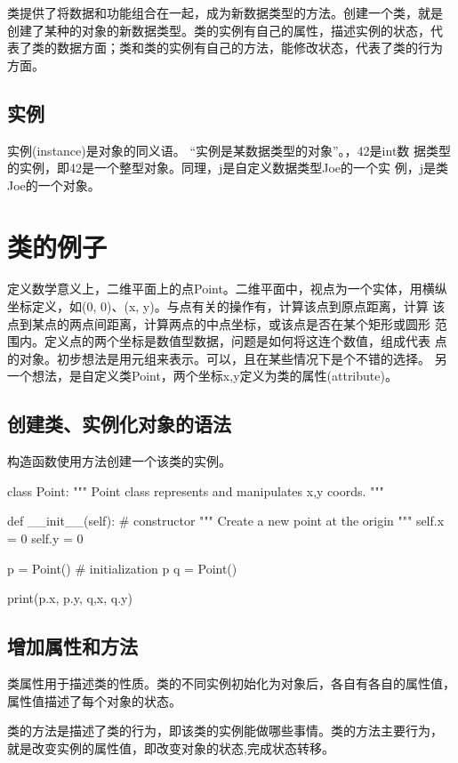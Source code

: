 类提供了将数据和功能组合在一起，成为新数据类型的方法。创建一个类，就是
创建了某种的对象的新数据类型。类的实例有自己的属性，描述实例的状态，代
表了类的数据方面；类和类的实例有自己的方法，能修改状态，代表了类的行为
方面。

\subsection{实例}
实例(instance)是对象的同义语。 “实例是某数据类型的对象”。，42是int数
据类型的实例，即42是一个整型对象。同理，j是自定义数据类型Joe的一个实
例，j是类Joe的一个对象。

\section{类的例子}

定义数学意义上，二维平面上的点Point。二维平面中，视点为一个实体，用横纵
坐标定义，如(0, 0)、(x, y)。与点有关的操作有，计算该点到原点距离，计算
该点到某点的两点间距离，计算两点的中点坐标，或该点是否在某个矩形或圆形
范围内。定义点的两个坐标是数值型数据，问题是如何将这连个数值，组成代表
点的对象。初步想法是用元组来表示。可以，且在某些情况下是个不错的选择。
另一个想法，是自定义类Point，两个坐标x,y定义为类的属性(attribute)。

\subsection{创建类、实例化对象的语法}

构造函数使用方法创建一个该类的实例。

\begin{python}
class Point:
    """ Point class represents and manipulates x,y coords. """

    def __init__(self):    #  constructor
        """ Create a new point at the origin """
        self.x = 0
        self.y = 0

p = Point()  # initialization p
q = Point()   

print(p.x, p.y, q,x, q.y)
\end{python}

\subsection{增加属性和方法}
类属性用于描述类的性质。类的不同实例初始化为对象后，各自有各自的属性值，
属性值描述了每个对象的状态。

类的方法是描述了类的行为，即该类的实例能做哪些事情。类的方法主要行为，
就是改变实例的属性值，即改变对象的状态,完成状态转移。

